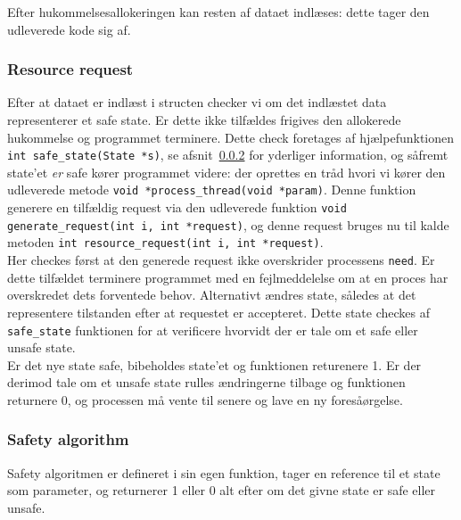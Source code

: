 \documentclass[main.tex]{subfile}
\begin{document}
\begin{center}
\begin{minipage}{0.8\textwidth}

\end{minipage}
\end{center}

Efter hukommelsesallokeringen kan resten af dataet indlæses: dette tager den udleverede kode sig af.

\subsubsection{Resource request}
Efter at dataet er indlæst i structen checker vi om det indlæstet data representerer et safe state. Er dette ikke tilfældes frigives den allokerede hukommelse og programmet terminere. Dette check foretages af hjælpefunktionen \texttt{int safe\_state(State *s)}, se afsnit~\ref{sec:safty} for yderliger information, og såfremt state'et \textit{er} safe kører programmet videre: der oprettes en tråd hvori vi kører den udleverede metode \texttt{void *process\_thread(void *param)}. Denne funktion generere en tilfældig request via den udleverede funktion \texttt{void generate\_request(int i, int *request)}, og denne request bruges nu til kalde metoden \texttt{int resource\_request(int i, int *request)}.\\

Her checkes først at den generede request ikke overskrider processens \texttt{need}. Er dette tilfældet terminere programmet med en fejlmeddelelse om at en proces har overskredet dets forventede behov. Alternativt ændres state, således at det representere tilstanden efter at requestet er accepteret. Dette state checkes af \texttt{safe\_state} funktionen for at verificere hvorvidt der er tale om et safe eller unsafe state. \\

Er det nye state safe, bibeholdes state'et og funktionen returenere 1. Er der derimod tale om et unsafe state rulles ændringerne tilbage og funktionen returnere 0, og processen må vente til senere og lave en ny foresåørgelse. 

\subsubsection{Safety algorithm}\label{sec:safty}
Safety algoritmen er defineret i sin egen funktion, tager en reference til et state som parameter, og returnerer 1 eller 0 alt efter om det givne state er safe eller unsafe.\\
\end{document}
